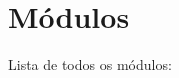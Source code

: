 \section{Módulos}
Lista de todos os módulos\+:\begin{DoxyCompactList}
\item {}
\begin{DoxyCompactList}
\item {}
\end{DoxyCompactList}
\end{DoxyCompactList}
